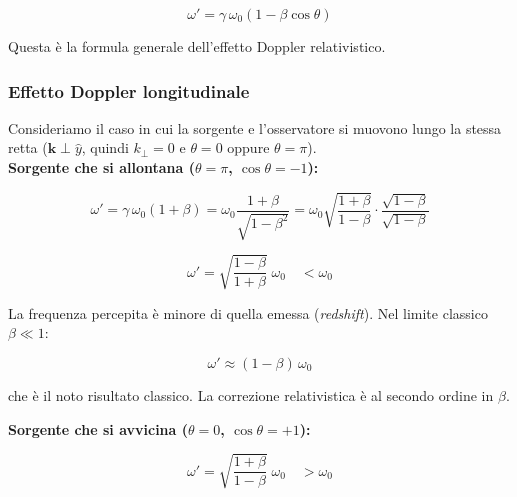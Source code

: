 \begin{equation}
    \omega' = \gamma\,\omega_0\left(1 - \beta\cos\theta\right)
\end{equation}

Questa è la formula generale dell'effetto Doppler relativistico.

\subsubsection*{Effetto Doppler longitudinale}

Consideriamo il caso in cui la sorgente e l'osservatore si muovono lungo la stessa retta ($\mathbf{k} \perp \hat{y}$, quindi $k_{\perp} = 0$ e $\theta = 0$ oppure $\theta = \pi$).\\

\textbf{Sorgente che si allontana ($\theta = \pi$, $\cos\theta = -1$):}

\begin{equation}
    \omega' = \gamma\,\omega_0(1 + \beta) = \omega_0 \frac{1+\beta}{\sqrt{1-\beta^2}} = \omega_0\sqrt{\frac{1+\beta}{1-\beta}} \cdot \frac{\sqrt{1-\beta}}{\sqrt{1-\beta}}
\end{equation}

\begin{tcolorbox}[colback=yellow!10!white, colframe=orange!70!black, boxrule=0.8pt]
\begin{equation}
    \omega' = \sqrt{\frac{1-\beta}{1+\beta}}\; \omega_0 \quad < \omega_0
\end{equation}
\end{tcolorbox}

La frequenza percepita è minore di quella emessa (\emph{redshift}). Nel limite classico $\beta \ll 1$:

\begin{equation}
    \omega' \approx (1 - \beta)\,\omega_0
\end{equation}

che è il noto risultato classico. La correzione relativistica è al secondo ordine in $\beta$. \\

\newpage

\textbf{Sorgente che si avvicina ($\theta = 0$, $\cos\theta = +1$):}

\begin{tcolorbox}[colback=yellow!10!white, colframe=orange!70!black, boxrule=0.8pt]
\begin{equation}
    \omega' = \sqrt{\frac{1+\beta}{1-\beta}}\; \omega_0 \quad > \omega_0
\end{equation}
\end{tcolorbox}

